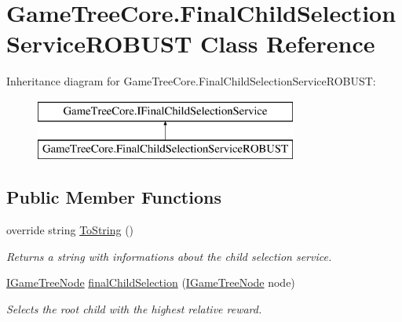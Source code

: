 \hypertarget{class_game_tree_core_1_1_final_child_selection_service_r_o_b_u_s_t}{}\section{Game\+Tree\+Core.\+Final\+Child\+Selection\+Service\+R\+O\+B\+U\+ST Class Reference}
\label{class_game_tree_core_1_1_final_child_selection_service_r_o_b_u_s_t}
Inheritance diagram for Game\+Tree\+Core.\+Final\+Child\+Selection\+Service\+R\+O\+B\+U\+ST\+:\begin{figure}[H]
\begin{center}
\leavevmode
\includegraphics[height=2.000000cm]{class_game_tree_core_1_1_final_child_selection_service_r_o_b_u_s_t}
\end{center}
\end{figure}
\subsection*{Public Member Functions}
\begin{DoxyCompactItemize}
\item 
override string \mbox{\hyperlink{class_game_tree_core_1_1_final_child_selection_service_r_o_b_u_s_t_abf32995059eff3ba39b40d3dfa1ed512}{To\+String}} ()
\begin{DoxyCompactList}\small\item\em Returns a string with informations about the child selection service. \end{DoxyCompactList}\item 
\mbox{\hyperlink{interface_game_tree_core_1_1_i_game_tree_node}{I\+Game\+Tree\+Node}} \mbox{\hyperlink{class_game_tree_core_1_1_final_child_selection_service_r_o_b_u_s_t_a8863618ea3c7a12f1dee3774ab62888e}{final\+Child\+Selection}} (\mbox{\hyperlink{interface_game_tree_core_1_1_i_game_tree_node}{I\+Game\+Tree\+Node}} node)
\begin{DoxyCompactList}\small\item\em Selects the root child with the highest relative reward. \end{DoxyCompactList}\end{DoxyCompactItemize}


